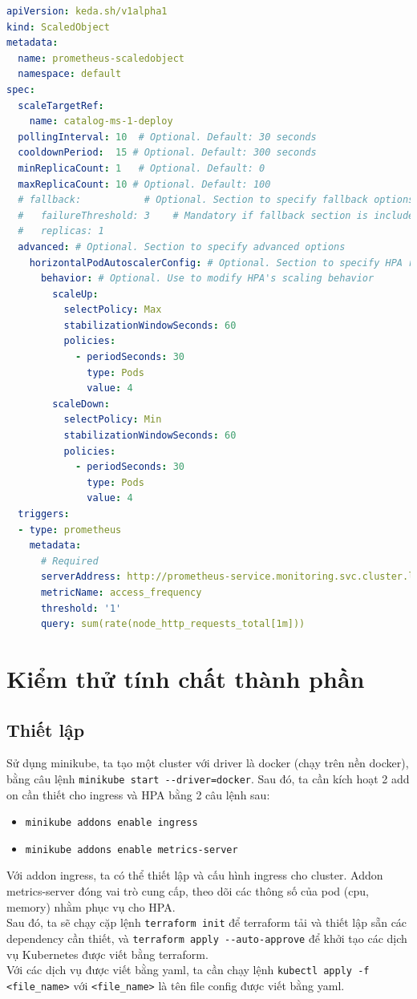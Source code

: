 \begin{lstlisting}[language=yaml]
apiVersion: keda.sh/v1alpha1
kind: ScaledObject
metadata:
  name: prometheus-scaledobject
  namespace: default
spec:
  scaleTargetRef:
    name: catalog-ms-1-deploy
  pollingInterval: 10  # Optional. Default: 30 seconds
  cooldownPeriod:  15 # Optional. Default: 300 seconds
  minReplicaCount: 1   # Optional. Default: 0
  maxReplicaCount: 10 # Optional. Default: 100
  # fallback:           # Optional. Section to specify fallback options
  #   failureThreshold: 3    # Mandatory if fallback section is included
  #   replicas: 1
  advanced: # Optional. Section to specify advanced options
    horizontalPodAutoscalerConfig: # Optional. Section to specify HPA related options
      behavior: # Optional. Use to modify HPA's scaling behavior
        scaleUp:
          selectPolicy: Max
          stabilizationWindowSeconds: 60
          policies:
            - periodSeconds: 30
              type: Pods
              value: 4
        scaleDown:
          selectPolicy: Min
          stabilizationWindowSeconds: 60
          policies:
            - periodSeconds: 30
              type: Pods
              value: 4
  triggers:
  - type: prometheus
    metadata:
      # Required
      serverAddress: http://prometheus-service.monitoring.svc.cluster.local:8080/
      metricName: access_frequency
      threshold: '1'
      query: sum(rate(node_http_requests_total[1m]))
\end{lstlisting}

\section{Kiểm thử tính chất thành phần}
\subsection{Thiết lập}
\noindent Sử dụng minikube, ta tạo một cluster với driver là docker (chạy trên nền docker), bằng câu lệnh \lstinline|minikube start --driver=docker|. Sau đó, ta cần kích hoạt 2 add on cần thiết cho ingress và HPA bằng 2 câu lệnh sau:
\begin{itemize}
  \item \lstinline|minikube addons enable ingress|
  \item \lstinline|minikube addons enable metrics-server|
\end{itemize}
Với addon ingress, ta có thể thiết lập và cấu hình ingress cho cluster. Addon metrics-server đóng vai trò cung cấp, theo dõi các thông số của pod (cpu, memory) nhằm phục vụ cho HPA.\\[0.5cm]
Sau đó, ta sẽ chạy cặp lệnh \lstinline|terraform init| để terraform tải và thiết lập sẵn các dependency cần thiết, và \lstinline|terraform apply --auto-approve| để khởi tạo các dịch vụ Kubernetes được viết bằng terraform.\\[0.5cm]
Với các dịch vụ được viết bằng yaml, ta cần chạy lệnh \lstinline|kubectl apply -f <file_name>| với \lstinline|<file_name>| là tên file config được viết bằng yaml.

